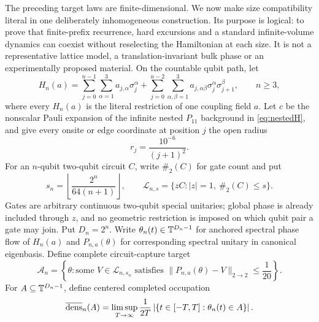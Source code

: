 The preceding target laws are finite-dimensional.  We now make size
compatibility literal in one deliberately inhomogeneous construction.  Its
purpose is logical: to prove that finite-prefix recurrence, hard excursions
and a standard infinite-volume dynamics can coexist without reselecting the
Hamiltonian at each size.  It is not a representative lattice model, a
translation-invariant bulk phase or an experimentally proposed material.
On the countable qubit path, let
\begin{equation}
 H_n(a)=\sum_{j=0}^{n-1}\sum_{\alpha=1}^{3}
   a_{j,\alpha}\sigma_j^\alpha
 +\sum_{j=0}^{n-2}\sum_{\alpha,\beta=1}^{3}
   a_{j,\alpha\beta}\sigma_j^\alpha\sigma_{j+1}^\beta,
 \qquad n\ge3,                                      \label{eq:samefieldH}
\end{equation}
where every $H_n(a)$ is the literal restriction of one coupling field
$a$.  Let $c$ be the nonscalar Pauli expansion of the infinite nested
$P_{11}$ background in \eqref{eq:nestedH}, and give every onsite or edge
coordinate at position $j$ the open radius
\begin{equation}
 r_j=\frac{10^{-6}}{(j+1)^2}.                         \label{eq:samefieldradius}
\end{equation}
For an $n$-qubit two-qubit circuit $C$, write $\#_2(C)$ for gate count and
put
\begin{equation}
 s_n=\left\lfloor\frac{2^n}{64(n+1)}\right\rfloor,
 \qquad
 \mathcal L_{n,s}=\{zC:|z|=1,\ \#_2(C)\le s\}.       \label{eq:samefieldtarget}
\end{equation}
Gates are arbitrary continuous two-qubit special unitaries; global phase is
already included through $z$, and no geometric restriction is imposed on
which qubit pair a gate may join.  Put $D_n=2^n$.  Write
$\theta_n(t)\in\mathbb T^{D_n-1}$ for anchored spectral phase flow of $H_n(a)$ and
$P_{n,a}(\theta)$ for corresponding spectral unitary in canonical
eigenbasis.  Define complete circuit-capture target
\begin{equation}
 \mathcal A_n=\left\{\theta:\text{some }V\in\mathcal L_{n,s_n}
 \text{ satisfies }\|P_{n,a}(\theta)-V\|_{2\to2}\le\frac1{20}\right\}.
                                                               \label{eq:samefieldcircuitset}
\end{equation}
For $A\subseteq\mathbb T^{D_n-1}$, define centered completed occupation
\begin{equation}
 \overline{\operatorname{dens}}_n(A)=\limsup_{T\to\infty}\frac1{2T}
 \left|\{t\in[-T,T]:\theta_n(t)\in A\}\right|.       \label{eq:samefieldoccupation}
\end{equation}

